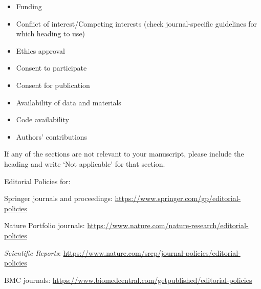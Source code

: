 \documentclass[
	a4paper, %
	10pt, %
	unnumberedsections, %
	twoside, %
]{LTJournalArticle}
\begin{document}
\begin{itemize}
\item Funding
\item Conflict of interest/Competing interests (check journal-specific guidelines for which heading to use)
\item Ethics approval 
\item Consent to participate
\item Consent for publication
\item Availability of data and materials
\item Code availability 
\item Authors' contributions
\end{itemize}

\noindent
If any of the sections are not relevant to your manuscript, please include the heading and write `Not applicable' for that section. 

\bigskip
\begin{flushleft}%
Editorial Policies for:

\bigskip\noindent
Springer journals and proceedings: \url{https://www.springer.com/gp/editorial-policies}

\bigskip\noindent
Nature Portfolio journals: \url{https://www.nature.com/nature-research/editorial-policies}

\bigskip\noindent
\textit{Scientific Reports}: \url{https://www.nature.com/srep/journal-policies/editorial-policies}

\bigskip\noindent
BMC journals: \url{https://www.biomedcentral.com/getpublished/editorial-policies}
\end{flushleft}
\end{document}
